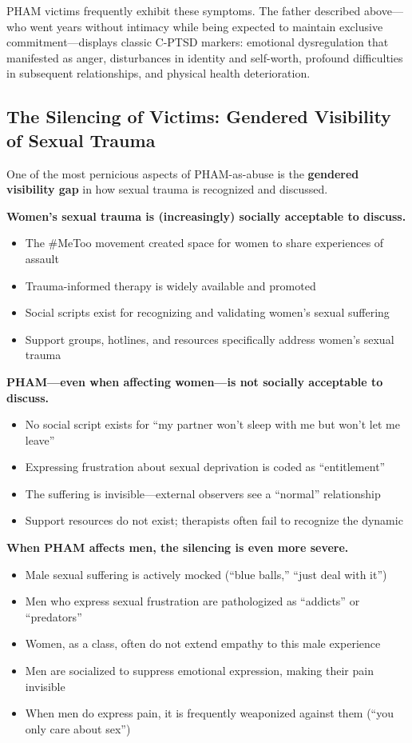 \documentclass[12pt,openany]{book}
\numberwithin{equation}{chapter}
\begin{document}
PHAM victims frequently exhibit these symptoms. The father described above---who went years without intimacy while being expected to maintain exclusive commitment---displays classic C-PTSD markers: emotional dysregulation that manifested as anger, disturbances in identity and self-worth, profound difficulties in subsequent relationships, and physical health deterioration.

\subsection{The Silencing of Victims: Gendered Visibility of Sexual Trauma}

One of the most pernicious aspects of PHAM-as-abuse is the \textbf{gendered visibility gap} in how sexual trauma is recognized and discussed.

\textbf{Women's sexual trauma is (increasingly) socially acceptable to discuss.}

\begin{itemize}
    \item The \#MeToo movement created space for women to share experiences of assault
    \item Trauma-informed therapy is widely available and promoted
    \item Social scripts exist for recognizing and validating women's sexual suffering
    \item Support groups, hotlines, and resources specifically address women's sexual trauma
\end{itemize}

\textbf{PHAM---even when affecting women---is not socially acceptable to discuss.}

\begin{itemize}
    \item No social script exists for ``my partner won't sleep with me but won't let me leave''
    \item Expressing frustration about sexual deprivation is coded as ``entitlement''
    \item The suffering is invisible---external observers see a ``normal'' relationship
    \item Support resources do not exist; therapists often fail to recognize the dynamic
\end{itemize}

\textbf{When PHAM affects men, the silencing is even more severe.}

\begin{itemize}
    \item Male sexual suffering is actively mocked (``blue balls,'' ``just deal with it'')
    \item Men who express sexual frustration are pathologized as ``addicts'' or ``predators''
    \item Women, as a class, often do not extend empathy to this male experience
    \item Men are socialized to suppress emotional expression, making their pain invisible
    \item When men do express pain, it is frequently weaponized against them (``you only care about sex'')
\end{itemize}
\end{document}
